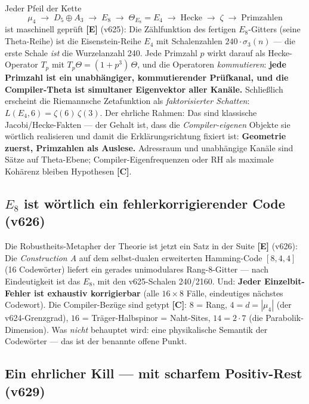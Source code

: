 \documentclass[11pt,a4paper]{article}
\newcommand{\E}{\textcolor{gut}{\textbf{[E]}}}
\newcommand{\C}{\textcolor{kern}{\textbf{[C]}}}
\begin{document}
Jeder Pfeil der Kette
\[
\mu_4 \;\to\; D_5 \oplus A_3 \;\to\; E_8 \;\to\;
\Theta_{E_8} = E_4 \;\to\; \text{Hecke} \;\to\; \zeta \;\to\;
\text{Primzahlen}
\]
ist maschinell geprüft \E{} (v625): Die Zählfunktion des fertigen
$E_8$-Gitters (seine Theta-Reihe) ist die Eisenstein-Reihe $E_4$ mit
Schalenzahlen $240 \cdot \sigma_3(n)$ --- die erste Schale \emph{ist}
die Wurzelanzahl 240. Jede Primzahl $p$ wirkt darauf als
Hecke-Operator $T_p$ mit $T_p \Theta = (1 + p^3)\,\Theta$, und die
Operatoren \emph{kommutieren}: \textbf{jede Primzahl ist ein
unabhängiger, kommutierender Prüfkanal, und die Compiler-Theta ist
simultaner Eigenvektor aller Kanäle.} Schließlich erscheint die
Riemannsche Zetafunktion als \emph{faktorisierter Schatten}:
$L(E_4, 6) = \zeta(6)\,\zeta(3)$. Der ehrliche Rahmen: Das sind
klassische Jacobi/Hecke-Fakten --- der Gehalt ist, dass die
\emph{Compiler-eigenen} Objekte sie wörtlich realisieren und damit
die Erklärungsrichtung fixiert ist: \textbf{Geometrie zuerst,
Primzahlen als Auslese.} \glqq{}Adressraum\grqq{} und
\glqq{}unabhängige Kanäle\grqq{} sind Sätze auf Theta-Ebene;
\glqq{}Compiler-Eigenfrequenzen\grqq{} oder \glqq{}RH als maximale
Kohärenz\grqq{} bleiben Hypothesen \C{}.

\subsection*{$E_8$ ist wörtlich ein fehlerkorrigierender Code (v626)}

Die Robustheits-Metapher der Theorie ist jetzt ein Satz in der
Suite \E{} (v626): Die \emph{Construction A} auf dem selbst-dualen
erweiterten Hamming-Code $[8,4,4]$ (16 Codewörter) liefert ein
gerades unimodulares Rang-8-Gitter --- nach Eindeutigkeit ist das
$E_8$, mit den v625-Schalen 240/2160. Und: \textbf{Jeder
Einzelbit-Fehler ist exhaustiv korrigierbar} (alle $16 \times 8$
Fälle, eindeutiges nächstes Codewort). Die Compiler-Bezüge sind
getypt \C{}: $8$ = Rang, $4 = d = |\mu_4|$ (der v624-Grenzgrad),
$16$ = Träger-Halbspinor = Naht-Sites, $14 = 2 \cdot 7$ (die
Parabolik-Dimension). Was \emph{nicht} behauptet wird: eine
physikalische Semantik der Codewörter --- das ist der benannte
offene Punkt.

\subsection*{Ein ehrlicher Kill --- mit scharfem Positiv-Rest (v629)}
\end{document}
